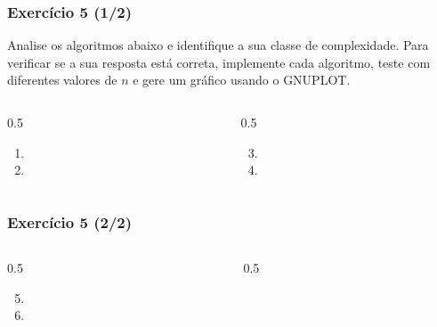 \documentclass[aspectratio=169]{beamer}
\begin{document}
\begin{frame}[fragile]\frametitle{Exercício 5 (1/2)}
Analise os algoritmos abaixo e identifique a sua classe de complexidade. Para verificar se a sua resposta está correta, implemente cada algoritmo, teste com diferentes valores de $n$ e gere um gráfico usando o GNUPLOT.
\vspace{-4mm}
\begin{columns}[T]
\begin{column}{0.5\linewidth}
\begin{enumerate}[a]
	\item {\scriptsize}
\vspace{-4mm}
	\item {\scriptsize}
\end{enumerate}
\end{column}
\begin{column}{0.5\linewidth}
\begin{enumerate}[a]
	\setcounter{enumi}{2}
	\item {\scriptsize}
\vspace{-4mm}
	\item {\scriptsize}
\end{enumerate}
	\end{column}
\end{columns}
\end{frame}

\begin{frame}[fragile]\frametitle{Exercício 5 (2/2)}
\begin{columns}[T]
\begin{column}{0.5\linewidth}
\begin{enumerate}[a]
	\setcounter{enumi}{4}
	\item {\scriptsize}
	\item {\scriptsize}
\end{enumerate}
\end{column}
\begin{column}{0.5\linewidth}
\end{column}
\end{columns}
\end{frame}
\end{document}

